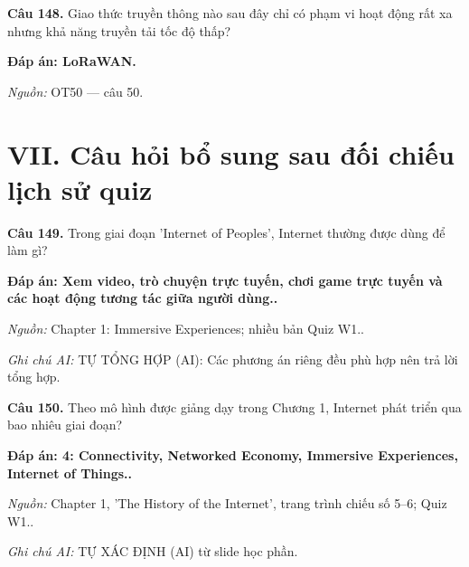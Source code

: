 \documentclass[11pt,a4paper]{article}
\begin{document}
\textbf{Câu 148.} Giao thức truyền thông nào sau đây chỉ có phạm vi hoạt động rất xa nhưng khả năng truyền tải tốc độ thấp?\par
{\color{answer}\textbf{Đáp án: LoRaWAN.}}\par
{\footnotesize\color{sourcegray}\textit{Nguồn:} OT50 — câu 50.\par}
\vspace{3pt}\par\noindent{\color{black!18}\rule{\linewidth}{0.3pt}}\par\medskip

\section*{VII. Câu hỏi bổ sung sau đối chiếu lịch sử quiz}

\textbf{Câu 149.} Trong giai đoạn 'Internet of Peoples', Internet thường được dùng để làm gì?\par
{\color{answer}\textbf{Đáp án: Xem video, trò chuyện trực tuyến, chơi game trực tuyến và các hoạt động tương tác giữa người dùng..}}\par
{\footnotesize\color{sourcegray}\textit{Nguồn:} Chapter 1: Immersive Experiences; nhiều bản Quiz W1..\par}
{\footnotesize\color{sourcegray}\textit{Ghi chú AI:} TỰ TỔNG HỢP (AI): Các phương án riêng đều phù hợp nên trả lời tổng hợp.\par}
\vspace{3pt}\par\noindent{\color{black!18}\rule{\linewidth}{0.3pt}}\par\medskip

\textbf{Câu 150.} Theo mô hình được giảng dạy trong Chương 1, Internet phát triển qua bao nhiêu giai đoạn?\par
{\color{answer}\textbf{Đáp án: 4: Connectivity, Networked Economy, Immersive Experiences, Internet of Things..}}\par
{\footnotesize\color{sourcegray}\textit{Nguồn:} Chapter 1, 'The History of the Internet', trang trình chiếu số 5–6; Quiz W1..\par}
{\footnotesize\color{sourcegray}\textit{Ghi chú AI:} TỰ XÁC ĐỊNH (AI) từ slide học phần.\par}
\vspace{3pt}\par\noindent{\color{black!18}\rule{\linewidth}{0.3pt}}\par\medskip
\end{document}
